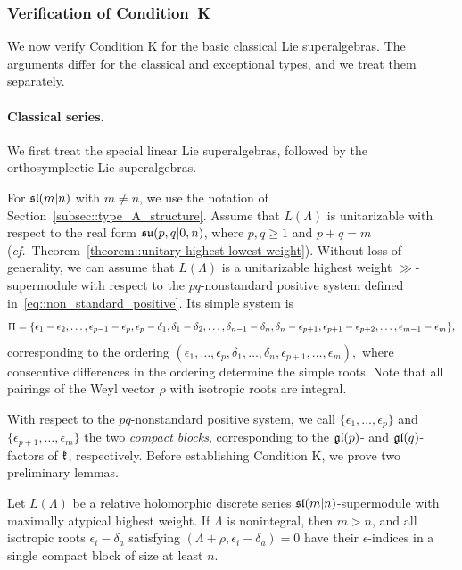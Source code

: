 \subsubsection{Verification of Condition~K} 
We now verify Condition K for the basic classical Lie superalgebras. The arguments differ for the classical and exceptional types, and we treat them separately. \medskip

\paragraph{\textbf{Classical series.}} We first treat the special linear Lie superalgebras, followed by the orthosymplectic Lie superalgebras. 

For $\slmn$ with $m\neq n$, we use the notation of Section~\ref{subsec::type_A_structure}. Assume that $L(\Lambda)$ is unitarizable with respect to the real form $\su(p,q\vert 0,n)$, where $p,q\geq1$ and $p+q=m$ (\emph{cf.}~Theorem~\ref{theorem::unitary-highest-lowest-weight}). Without loss of generality, we can assume that $L(\Lambda)$ is a unitarizable highest weight $\gg$-supermodule with respect to the $pq$-nonstandard positive system defined in~\eqref{eq::non_standard_positive}. Its simple system is
\begin{equation}
\begin{aligned}
\Uppi
={}
\{\epsilon_1-\epsilon_2,\ldots,\epsilon_{p-1}-\epsilon_p,
\epsilon_p-\delta_1,\delta_1-\delta_2,\ldots,\delta_{n-1}-\delta_n,
\delta_n-\epsilon_{p+1},\epsilon_{p+1}-\epsilon_{p+2},\ldots,
\epsilon_{m-1}-\epsilon_m\},
\end{aligned}
\end{equation}
corresponding to the ordering
$
(\epsilon_1,\ldots,\epsilon_p,\delta_1,\ldots,\delta_n,
\epsilon_{p+1},\ldots,\epsilon_m),
$
where consecutive differences in the ordering determine the simple roots. Note that all pairings of the Weyl vector $\rho$ with isotropic roots are integral. 

With respect to the $pq$-nonstandard positive system, we call
$
\{\epsilon_1,\ldots,\epsilon_p\}
$ and $
\{\epsilon_{p+1},\ldots,\epsilon_m\}$
the two \emph{compact blocks}, corresponding to the $\gl(p)$- and $\gl(q)$-factors of $\kk$, respectively. Before establishing Condition K, we prove two preliminary lemmas.


\begin{lemma}\label{lemm::non_integral_slmn_weight}
Let $L(\Lambda)$ be a relative holomorphic discrete series $\sl(m\vert n)$-supermodule with maximally atypical highest weight. If $\Lambda$ is nonintegral, then $m>n$, and all isotropic roots $\epsilon_i-\delta_a$ satisfying $(\Lambda+\rho,\epsilon_i-\delta_a)=0$ have their $\epsilon$-indices in a single compact block of size at least $n$.
\end{lemma}

